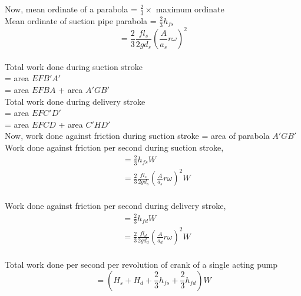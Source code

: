 \documentclass{article}
\begin{document}
\begin{multicols}{2}
      Now, mean ordinate of a parabola = $\frac{2}{3} \times $ maximum ordinate \\
      Mean ordinate of suction pipe parabola = $\frac{2}{3} h_{fs}$  $$= \frac{2}{3} \frac{f l_s}{2 g d_s} \left(\frac{A}{a_s} r \omega \right)^2$$\\ 

      Total work done during suction stroke \\= area $EFB'A'$ \\= area $EFBA$ + area $A'GB'$ \\

      Total work done during delivery stroke \\= area $EFC'D'$ \\= area $EFCD$ + area $C'HD'$ \\

      Now, work done against friction during suction stroke = area of parabola $A'GB'$\\


      Work done against friction per second during suction stroke,
      \begin{align*}
        &= \frac{2}{3} h_{fs} W \\
        &= \frac{2}{3} \frac{f l_s}{2 g d_s} \left(\frac{A}{a_s} r \omega \right)^2 W \\
      \end{align*}

      Work done against friction per second during delivery stroke,
      \begin{align*}
        &= \frac{2}{3} h_{fd} W \\
        &= \frac{2}{3} \frac{f l_d}{2 g d_d} \left(\frac{A}{a_d} r \omega \right)^2 W \\
      \end{align*}

      Total work done per second per revolution of crank of a single acting pump\\
      $$= \left( H_s + H_d + \frac{2}{3} h_{fs} + \frac{2}{3} h_{fd} \right) W $$

    \end{multicols}
\end{document}
